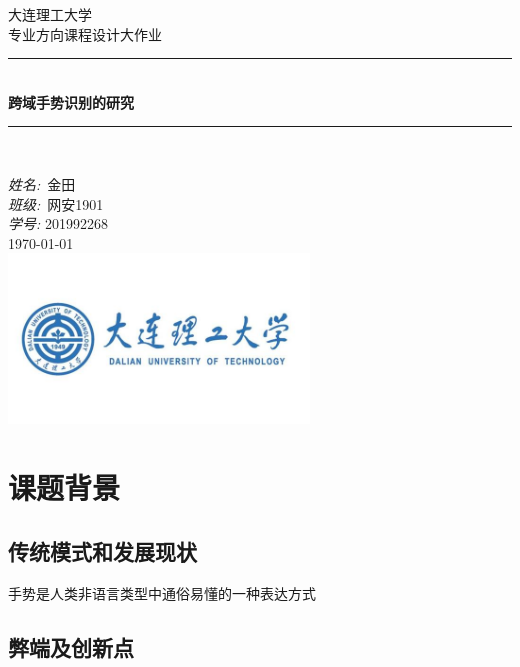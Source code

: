 \message{ !name(main.tex)}\documentclass[a4paper]{article}
\begin{document}


\begin{titlepage}

\newcommand{\HRule}{\rule{\linewidth}{0.5mm}} 							%
\center 
 
\textsc{\LARGE 大连理工大学}\\[1cm]

\textsc{\Large 专业方向课程设计大作业}\\[0.2cm]

\HRule \\[0.8cm]
{ \huge \bfseries 跨域手势识别的研究}\\[0.7cm]								
\HRule \\[2cm]

\large

\emph{姓名:}\ 金\quad \quad 田  \\
\emph{班级:}\ 网安1901\\
\emph{学号:} 201992268\\[1.5cm]													%
{\large \today}\\[5cm]

\includegraphics[width=0.6\textwidth]{images/dlut.png}\\[1cm] 	%
\vfill 
\end{titlepage}


\setmainfont{Times New Roman}

\tableofcontents

\section{课题背景}
\subsection{传统模式和发展现状}
手势是人类非语言类型中通俗易懂的一种表达方式
\subsection{弊端及创新点}
\end{document}
